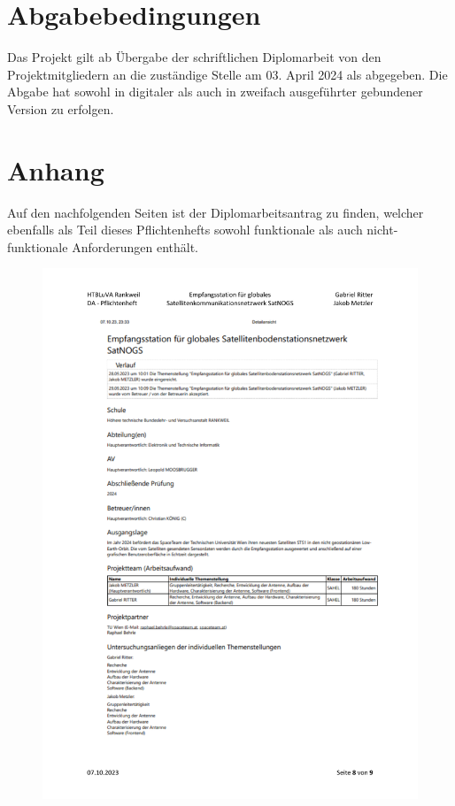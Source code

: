\section{Abgabebedingungen}
Das Projekt gilt ab Übergabe der schriftlichen Diplomarbeit von den Projektmitgliedern an die 
zuständige Stelle am 03. April 2024 als abgegeben. Die Abgabe hat sowohl in digitaler als auch in 
zweifach ausgeführter gebundener Version zu erfolgen. 

\section{Anhang}
Auf den nachfolgenden Seiten ist der Diplomarbeitsantrag zu finden, welcher ebenfalls als Teil dieses 
Pflichtenhefts sowohl funktionale als auch nicht-funktionale Anforderungen enthält.
\newpage

\begin{figure}
	\centering
	\includegraphics[width=\textwidth]{../ref/DA_Metzler_Ritter_Pflichtenheft_v1.2-page8.pdf}
\end{figure}

